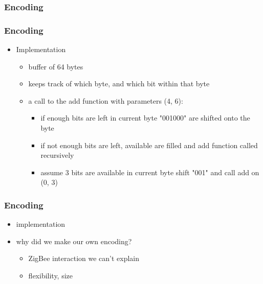 \subsubsection{Encoding}
  \begin{frame}
  	\frametitle{Encoding}
  	\begin{itemize}
        \item Implementation 
    	\begin{itemize}
            \item buffer of 64 bytes
            \item keeps track of which byte, and which bit within that byte
            \item a call to the add function with parameters (4, 6):
            \begin{itemize}
                \item if enough bits are left in current byte "001000" are shifted onto the byte
                \item if not enough bits are left, available are filled and add function called recursively
                \item assume 3 bits are available in current byte shift "001" and call add on (0, 3)
            \end{itemize}            
        \end{itemize}
    \end{itemize}          	
  \end{frame}

\begin{frame}
	\frametitle{Encoding}
    \begin{itemize}
        \item implementation
		\item why did we make our own encoding?
        \begin{itemize}
            \item ZigBee interaction we can't explain
            \item flexibility, size
        \end{itemize}
    \end{itemize}
\end{frame}